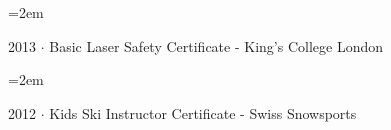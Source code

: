 \documentclass{scrartcl}
\newcommand{\Description}[1]{\hangindent=2em\hangafter=0\noindent\raggedright\footnotesize{#1}\par\normalsize\vspace{1em}} %
\begin{document}
\begin{cv}{}
\vspace{-0.5em} 

\Description{2013 $\cdotp$ Basic Laser Safety Certificate - King's College London}

\vspace{-0.5em} 

\Description{2012 $\cdotp$ Kids Ski Instructor Certificate - Swiss Snowsports}



\end{cv}
\end{document}
